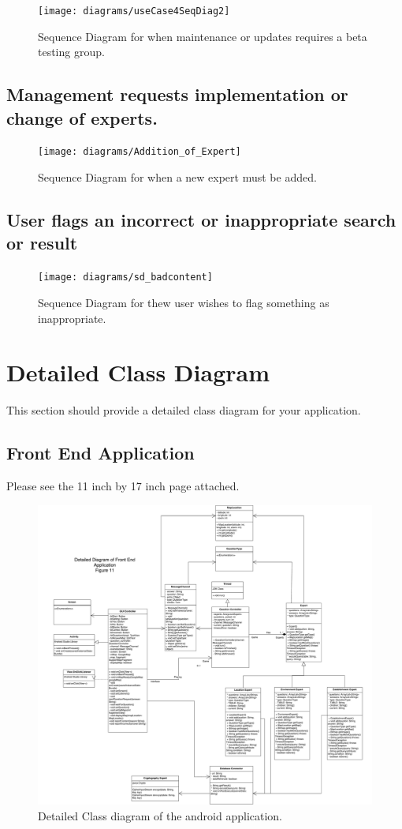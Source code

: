 \documentclass[titlepage]{article}
\begin{document}
\begin{figure}[H]
\texttt{[image: diagrams/useCase4SeqDiag2]}
\caption{Sequence Diagram for when maintenance or updates requires a beta testing group.}\label{sd:survey_of_experts}
\end{figure}
\subsection{Management requests implementation or change of experts.}
\begin{figure}[H]
\texttt{[image: diagrams/Addition\_of\_Expert]}
\caption{Sequence Diagram for when a new expert must be added.}\label{sd:addition_of_expert}
\end{figure}
\subsection{User flags an incorrect or inappropriate search or result}
\begin{figure}[H]
\texttt{[image: diagrams/sd\_badcontent]}
\caption{Sequence Diagram for thew user wishes to flag something as inappropriate.}\label{sd:bad_content}
\end{figure}
\newpage
\section{Detailed Class Diagram}
\label{sec:detailed_class_diagram}
This section should provide a detailed class diagram for your application.

\subsection{Front End Application}
Please see the 11 inch by 17 inch page attached.

\begin{figure}
\includegraphics[scale=0.1]{diagrams/Class_Diagram}
\caption{Detailed Class diagram of the android application.}\label{sd:android_application}
\end{figure}
\end{document}
